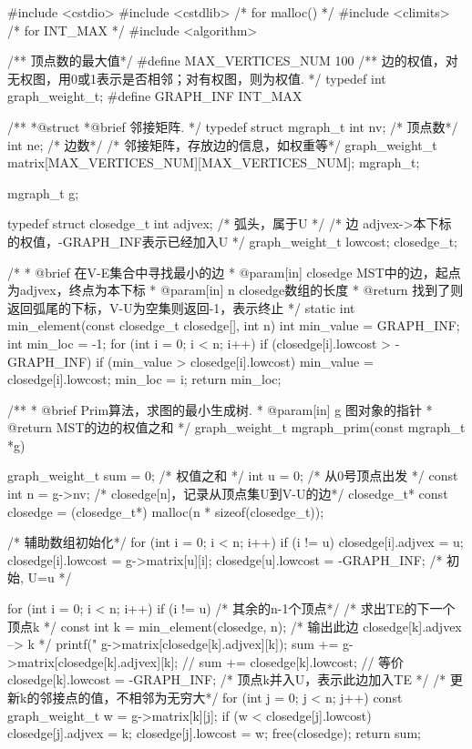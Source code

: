 \begin{Codex}[label=mgraph_prim1.cpp]
#include <cstdio>
#include <cstdlib>  /* for malloc() */
#include <climits>  /* for INT_MAX */
#include <algorithm>

/** 顶点数的最大值*/
#define MAX_VERTICES_NUM 100
/** 边的权值，对无权图，用0或1表示是否相邻；对有权图，则为权值. */
typedef int graph_weight_t;
#define GRAPH_INF INT_MAX

/**
 *@struct
 *@brief 邻接矩阵.
 */
typedef struct mgraph_t {
    int nv; /* 顶点数*/
    int ne; /* 边数*/
    /* 邻接矩阵，存放边的信息，如权重等*/
    graph_weight_t matrix[MAX_VERTICES_NUM][MAX_VERTICES_NUM];
} mgraph_t;

mgraph_t g;

typedef struct closedge_t {
    int adjvex; /* 弧头，属于U */
    /* 边 adjvex->本下标 的权值，-GRAPH_INF表示已经加入U */
    graph_weight_t lowcost;
} closedge_t;

/*
 * @brief 在V-E集合中寻找最小的边
 * @param[in] closedge MST中的边，起点为adjvex，终点为本下标
 * @param[in] n closedge数组的长度
 * @return 找到了则返回弧尾的下标，V-U为空集则返回-1，表示终止
 */
static int min_element(const closedge_t closedge[], int n) {
    int min_value = GRAPH_INF;
    int min_loc = -1;
    for (int i = 0; i < n; i++)
        if (closedge[i].lowcost > -GRAPH_INF) {
            if (min_value > closedge[i].lowcost) {
                min_value = closedge[i].lowcost;
                min_loc = i;
            }
        }
    return min_loc;
}

/**
 * @brief Prim算法，求图的最小生成树.
 * @param[in] g 图对象的指针
 * @return MST的边的权值之和
 */
graph_weight_t mgraph_prim(const mgraph_t *g) {
    graph_weight_t sum = 0; /* 权值之和 */
    int u = 0; /* 从0号顶点出发 */
    const int n = g->nv;
    /* closedge[n]，记录从顶点集U到V-U的边*/
    closedge_t* const closedge = (closedge_t*) malloc(n * sizeof(closedge_t));

    /* 辅助数组初始化*/
    for (int i = 0; i < n; i++) if (i != u) {
        closedge[i].adjvex = u;
        closedge[i].lowcost = g->matrix[u][i];
    }
    closedge[u].lowcost = -GRAPH_INF; /* 初始, U={u} */

    for (int i = 0; i < n; i++) if (i != u) { /* 其余的n-1个顶点*/
        /* 求出TE的下一个顶点k */
        const int k = min_element(closedge, n);
        /* 输出此边 closedge[k].adjvex --> k */
        printf("%
                g->matrix[closedge[k].adjvex][k]);
        sum += g->matrix[closedge[k].adjvex][k];
        // sum += closedge[k].lowcost;  // 等价
        closedge[k].lowcost = -GRAPH_INF;  /* 顶点k并入U，表示此边加入TE */
        /* 更新k的邻接点的值，不相邻为无穷大*/
        for (int j = 0; j < n; j++) {
            const graph_weight_t w = g->matrix[k][j];
            if (w < closedge[j].lowcost) {
                closedge[j].adjvex = k;
                closedge[j].lowcost = w;
            }
        }
    }
    free(closedge);
    return sum;
}


\end{Codex}
